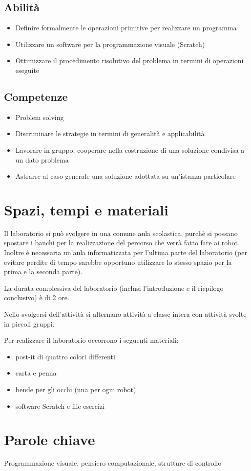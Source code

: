 \documentclass[12pt]{article}
\begin{document}
\subsection{Abilità}
\begin{itemize}
\item Definire formalmente le operazioni primitive per realizzare un programma
\item Utilizzare un software per la programmazione visuale (Scratch)
\item Ottimizzare il procedimento risolutivo del problema in termini di operazioni eseguite
\end{itemize}

\subsection{Competenze}
\begin{itemize}
\item Problem solving
\item Discriminare le strategie in termini di generalità e applicabilità
\item Lavorare in gruppo, cooperare nella costruzione di una soluzione condivisa a un dato problema
\item Astrarre al caso generale una soluzione adottata su un’istanza particolare
\end{itemize}
%
%
\section{Spazi, tempi e materiali}
Il laboratorio si può svolgere in una comune aula scolastica, purchè si possano spostare i banchi per la realizzazione del percorso che verrà fatto fare ai robot. Inoltre è necessaria un'aula informatizzata per l'ultima parte del laboratorio (per evitare perdite di tempo sarebbe opportuno utilizzare lo stesso spazio per la prima e la seconda parte).

La durata complessiva del laboratorio (inclusi l'introduzione e il riepilogo conclusivo) è di 2 ore.

Nello svolgersi dell'attività si alternano attività a classe intera con attività svolte in piccoli gruppi.

Per realizzare il laboratorio occorrono i seguenti materiali:
\begin{itemize}
\item post-it di quattro colori differenti
\item carta e penna
\item bende per gli occhi (una per ogni robot)
\item software Scratch e file esercizi
\end{itemize}
%
%
\section{Parole chiave}
Programmazione visuale, pensiero computazionale, strutture di controllo
%
% 
\end{document}
